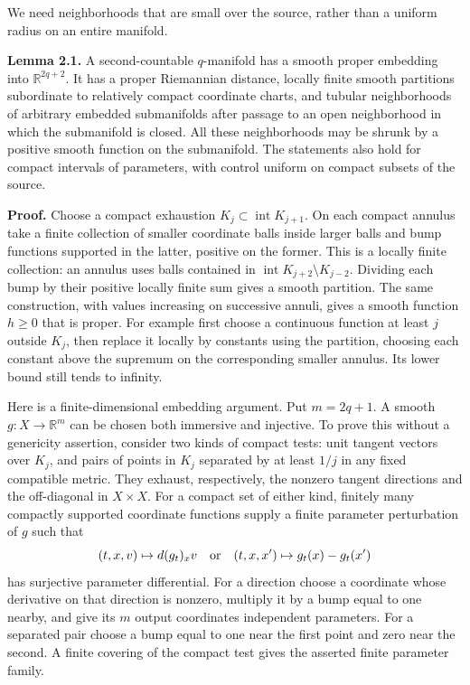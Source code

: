 \documentclass[
  11pt,
]{article}
\begin{document}
We need neighborhoods that are small over the source, rather than a
uniform radius on an entire manifold.

\textbf{Lemma 2.1.} A second-countable \(q\)-manifold has a smooth
proper embedding into \(\mathbb R^{2q+2}\). It has a proper Riemannian
distance, locally finite smooth partitions subordinate to relatively
compact coordinate charts, and tubular neighborhoods of arbitrary
embedded submanifolds after passage to an open neighborhood in which the
submanifold is closed. All these neighborhoods may be shrunk by a
positive smooth function on the submanifold. The statements also hold
for compact intervals of parameters, with control uniform on compact
subsets of the source.

\textbf{Proof.} Choose a compact exhaustion
\(K_j\subset\operatorname{int}K_{j+1}\). On each compact annulus take a
finite collection of smaller coordinate balls inside larger balls and
bump functions supported in the latter, positive on the former. This is
a locally finite collection: an annulus uses balls contained in
\(\operatorname{int}K_{j+2}\setminus K_{j-2}\). Dividing each bump by
their positive locally finite sum gives a smooth partition. The same
construction, with values increasing on successive annuli, gives a
smooth function \(h\geq0\) that is proper. For example first choose a
continuous function at least \(j\) outside \(K_j\), then replace it
locally by constants using the partition, choosing each constant above
the supremum on the corresponding smaller annulus. Its lower bound still
tends to infinity.

Here is a finite-dimensional embedding argument. Put \(m=2q+1\). A
smooth \(g:X\to\mathbb R^m\) can be chosen both immersive and injective.
To prove this without a genericity assertion, consider two kinds of
compact tests: unit tangent vectors over \(K_j\), and pairs of points in
\(K_j\) separated by at least \(1/j\) in any fixed compatible metric.
They exhaust, respectively, the nonzero tangent directions and the
off-diagonal in \(X\times X\). For a compact set of either kind,
finitely many compactly supported coordinate functions supply a finite
parameter perturbation of \(g\) such that \[
 (t,x,v)\mapsto d(g_t)_xv
 \quad\hbox{or}\quad
 (t,x,x')\mapsto g_t(x)-g_t(x')
\] has surjective parameter differential. For a direction choose a
coordinate whose derivative on that direction is nonzero, multiply it by
a bump equal to one nearby, and give its \(m\) output coordinates
independent parameters. For a separated pair choose a bump equal to one
near the first point and zero near the second. A finite covering of the
compact test gives the asserted finite parameter family.
\end{document}
